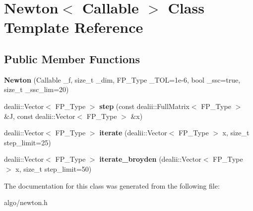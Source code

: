 \hypertarget{classNewton}{}\section{Newton$<$ Callable $>$ Class Template Reference}
\label{classNewton}
\subsection*{Public Member Functions}
\begin{DoxyCompactItemize}
\item 
\mbox{\label{classNewton_a8271deaf4a7dd62152c126fb506b8d9b}} 
{\bfseries Newton} (Callable \+\_\+f, size\+\_\+t \+\_\+dim, F\+P\+\_\+\+Type \+\_\+\+T\+OL=1e-\/6, bool \+\_\+ssc=true, size\+\_\+t \+\_\+ssc\+\_\+lim=20)
\item 
\mbox{\label{classNewton_af1d9bcbab5d492230aa0415c24016640}} 
dealii\+::\+Vector$<$ F\+P\+\_\+\+Type $>$ {\bfseries step} (const dealii\+::\+Full\+Matrix$<$ F\+P\+\_\+\+Type $>$ \&J, const dealii\+::\+Vector$<$ F\+P\+\_\+\+Type $>$ \&x)
\item 
\mbox{\label{classNewton_ab8f1b8668fcc7de11c3ea3f0887456ef}} 
dealii\+::\+Vector$<$ F\+P\+\_\+\+Type $>$ {\bfseries iterate} (dealii\+::\+Vector$<$ F\+P\+\_\+\+Type $>$ x, size\+\_\+t step\+\_\+limit=25)
\item 
\mbox{\label{classNewton_a324169685445ba3cda382f05fac41aab}} 
dealii\+::\+Vector$<$ F\+P\+\_\+\+Type $>$ {\bfseries iterate\+\_\+broyden} (dealii\+::\+Vector$<$ F\+P\+\_\+\+Type $>$ x, size\+\_\+t step\+\_\+limit=50)
\end{DoxyCompactItemize}


The documentation for this class was generated from the following file\+:\begin{DoxyCompactItemize}
\item 
algo/newton.\+h\end{DoxyCompactItemize}
